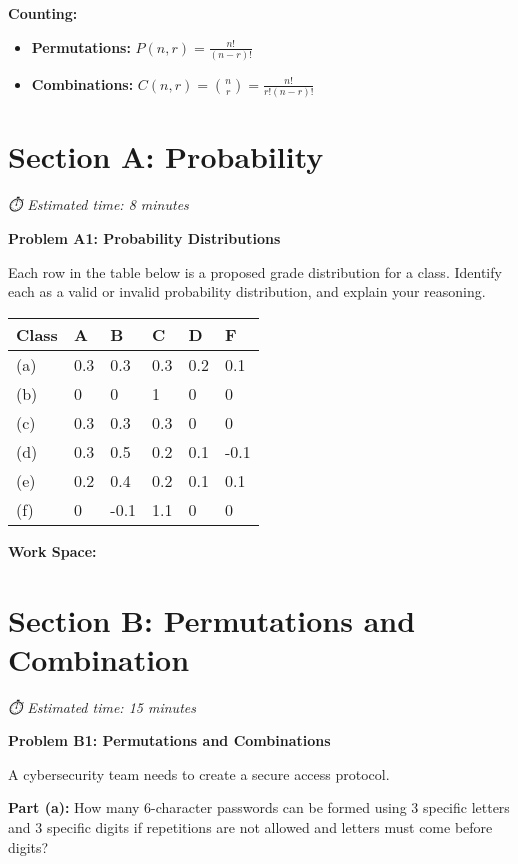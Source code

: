 \documentclass[
  11pt,
]{article}
\begin{document}
\textbf{Counting:}

\begin{itemize}
\item
  \textbf{Permutations:} \(P(n,r) = \frac{n!}{(n-r)!}\)
\item
  \textbf{Combinations:} \(C(n,r) = \binom{n}{r} = \frac{n!}{r!(n-r)!}\)
\end{itemize}

\section{Section A: Probability}\label{section-a-probability}

\emph{⏱️ Estimated time: 8 minutes}

\textbf{Problem A1: Probability Distributions}

Each row in the table below is a proposed grade distribution for a
class. Identify each as a valid or invalid probability distribution, and
explain your reasoning.

\begin{longtable}[]{@{}llllll@{}}
\toprule\noalign{}
Class & A & B & C & D & F \\
\midrule\noalign{}
\endhead
\bottomrule\noalign{}
\endlastfoot
(a) & 0.3 & 0.3 & 0.3 & 0.2 & 0.1 \\
(b) & 0 & 0 & 1 & 0 & 0 \\
(c) & 0.3 & 0.3 & 0.3 & 0 & 0 \\
(d) & 0.3 & 0.5 & 0.2 & 0.1 & -0.1 \\
(e) & 0.2 & 0.4 & 0.2 & 0.1 & 0.1 \\
(f) & 0 & -0.1 & 1.1 & 0 & 0 \\
\end{longtable}

\textbf{Work Space:}

\section{Section B: Permutations and
Combination}\label{section-b-permutations-and-combination}

\emph{⏱️ Estimated time: 15 minutes}

\textbf{Problem B1: Permutations and Combinations}

A cybersecurity team needs to create a secure access protocol.

\textbf{Part (a):} How many 6-character passwords can be formed using 3
specific letters and 3 specific digits if repetitions are not allowed
and letters must come before digits?
\end{document}
